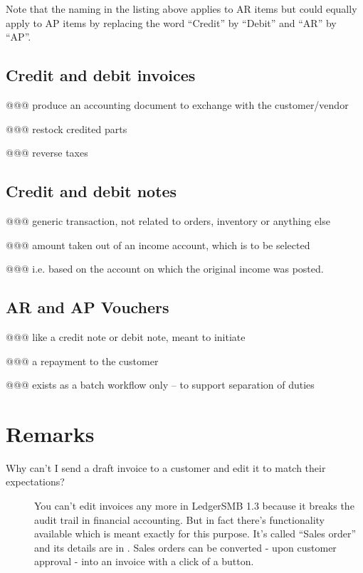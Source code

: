 Note that the naming in the listing above applies to AR items but could equally apply
to AP items by replacing the word ``Credit'' by ``Debit'' and ``AR'' by ``AP''.



\subsection{Credit and debit invoices}

@@@ produce an accounting document to exchange with the customer/vendor

@@@ restock credited parts

@@@ reverse taxes

\subsection{Credit and debit notes}

@@@ generic transaction, not related to orders, inventory or anything else

@@@ amount taken out of an income account, which is to be selected

@@@ i.e. based on the account on which the original income was posted.

\subsection{AR and AP Vouchers}

@@@ like a credit note or debit note, meant to initiate

@@@ a repayment to the customer

@@@ exists as a batch workflow only -- to support separation of duties


\section{Remarks}
\label{sec-workflows-accounting-remarks}


\begin{description}
\item [Why can't I send a draft invoice to a \gls{customer} and edit it
   to match their expectations?] 
You can't edit invoices any more in LedgerSMB 1.3 because it breaks the audit trail
in financial accounting. But in fact there's functionality available which is meant
exactly for this purpose. It's called ``Sales order'' and its details are in
. Sales orders can be converted - upon \gls{customer} approval -
into an invoice with a click of a button.
\end{description}


